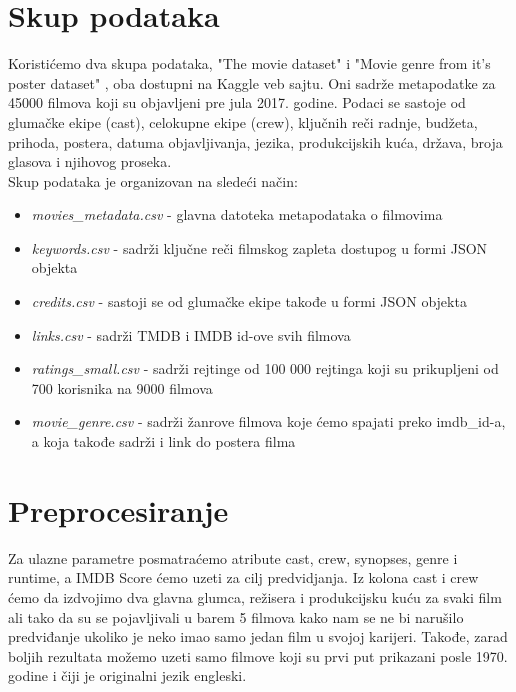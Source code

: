 \documentclass[a4paper]{article}
\begin{document}
\section{Skup podataka}
\label{sec:skupPodataka}
Koristićemo dva skupa podataka, "The movie dataset" \cite{movieDataset} i "Movie genre from it's poster dataset" \cite{movieGenres}, oba dostupni na Kaggle \cite{kaggle} veb sajtu. Oni sadrže metapodatke za 45000 filmova koji su objavljeni pre jula 2017. godine. Podaci se sastoje od glumačke ekipe (cast), celokupne ekipe (crew), ključnih reči radnje, budžeta, prihoda, postera, datuma objavljivanja, jezika, produkcijskih kuća, država, broja glasova i njihovog proseka.\\

Skup podataka je organizovan na sledeći način:
\begin{itemize}
	\item \textit{movies\_metadata.csv} - glavna datoteka metapodataka o filmovima
	\item \textit{keywords.csv} - sadrži ključne reči filmskog zapleta dostupog u formi JSON objekta
	\item \textit{credits.csv} - sastoji se od glumačke ekipe takođe u formi JSON objekta
	\item \textit{links.csv} - sadrži TMDB i IMDB id-ove svih filmova
	\item \textit{ratings\_small.csv} - sadrži rejtinge od 100 000 rejtinga koji su prikupljeni od 700 korisnika na 9000 filmova
	\item \textit{movie\_genre.csv} - sadrži žanrove filmova koje ćemo spajati preko imdb\_id-a, a koja takođe sadrži i link do postera filma
\end{itemize}


\section{Preprocesiranje}
\label{sec:preprocesiranje}

Za ulazne parametre posmatraćemo atribute cast, crew, synopses, genre i runtime, a IMDB Score ćemo uzeti za cilj predvidjanja. Iz kolona cast i crew ćemo da izdvojimo dva glavna glumca, režisera i produkcijsku kuću za svaki film ali tako da su se pojavljivali u barem 5 filmova kako nam se ne bi narušilo predviđanje ukoliko je neko imao samo jedan film u svojoj karijeri. Takođe, zarad boljih rezultata možemo uzeti samo filmove koji su prvi put prikazani posle 1970. godine i čiji je originalni jezik engleski.
\end{document}
